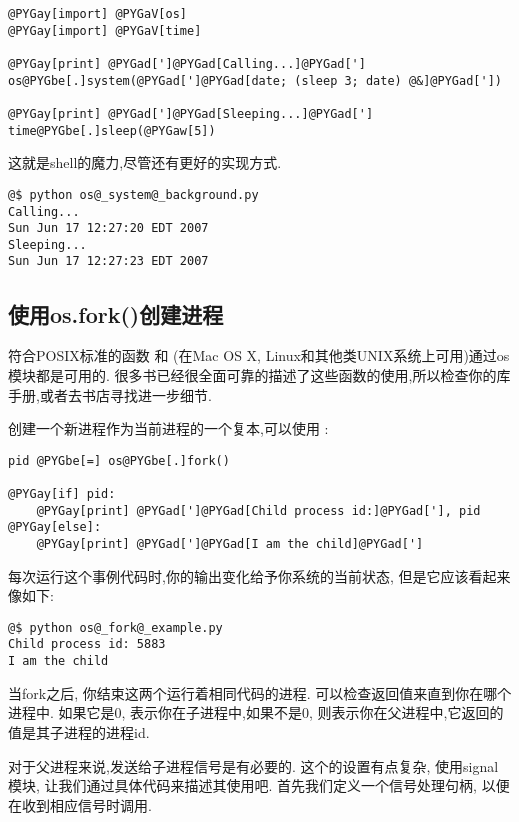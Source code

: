 \documentclass[a4paper,10pt,english]{manual}
\begin{document}
\begin{Verbatim}[commandchars=@\[\]]
@PYGay[import] @PYGaV[os]
@PYGay[import] @PYGaV[time]

@PYGay[print] @PYGad[']@PYGad[Calling...]@PYGad[']
os@PYGbe[.]system(@PYGad[']@PYGad[date; (sleep 3; date) @&]@PYGad['])

@PYGay[print] @PYGad[']@PYGad[Sleeping...]@PYGad[']
time@PYGbe[.]sleep(@PYGaw[5])
\end{Verbatim}

这就是shell的魔力,尽管还有更好的实现方式.

\begin{Verbatim}[commandchars=@\[\]]
@$ python os@_system@_background.py
Calling...
Sun Jun 17 12:27:20 EDT 2007
Sleeping...
Sun Jun 17 12:27:23 EDT 2007
\end{Verbatim}


\subsection{使用os.fork()创建进程}

符合POSIX标准的函数  和  (在Mac OS X, Linux和其他类UNIX系统上可用)通过os模块都是可用的. 很多书已经很全面可靠的描述了这些函数的使用,所以检查你的库手册,或者去书店寻找进一步细节.

创建一个新进程作为当前进程的一个复本,可以使用  :

\begin{Verbatim}[commandchars=@\[\]]
pid @PYGbe[=] os@PYGbe[.]fork()

@PYGay[if] pid:
    @PYGay[print] @PYGad[']@PYGad[Child process id:]@PYGad['], pid
@PYGay[else]:
    @PYGay[print] @PYGad[']@PYGad[I am the child]@PYGad[']
\end{Verbatim}

每次运行这个事例代码时,你的输出变化给予你系统的当前状态, 但是它应该看起来像如下:

\begin{Verbatim}[commandchars=@\[\]]
@$ python os@_fork@_example.py
Child process id: 5883
I am the child
\end{Verbatim}

当fork之后, 你结束这两个运行着相同代码的进程. 可以检查返回值来直到你在哪个进程中. 如果它是0, 表示你在子进程中,如果不是0, 则表示你在父进程中,它返回的值是其子进程的进程id.

对于父进程来说,发送给子进程信号是有必要的. 这个的设置有点复杂, 使用signal模块, 让我们通过具体代码来描述其使用吧. 首先我们定义一个信号处理句柄, 以便在收到相应信号时调用.
\end{document}
